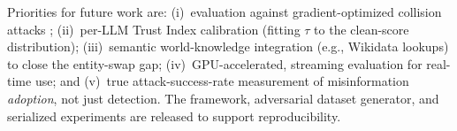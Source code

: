 \documentclass[conference]{IEEEtran}
\begin{document}
Priorities for future work are: (i)~evaluation against gradient-optimized
collision attacks \cite{zou2024poisoned}; (ii)~per-LLM Trust Index calibration
(fitting $\tau$ to the clean-score distribution); (iii)~semantic world-knowledge
integration (e.g., Wikidata lookups) to close the entity-swap gap;
(iv)~GPU-accelerated, streaming evaluation for real-time use; and (v)~true
attack-success-rate measurement of misinformation \emph{adoption}, not just
detection. The framework, adversarial dataset generator, and serialized
experiments are released to support reproducibility.

\end{document}
